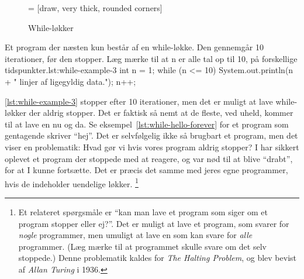         \begin{figure}
        \center
         = [draw, very thick, rounded corners]
        \caption{While-løkker}
        \label{fig:while-loop-illustrated}
        \end{figure}

		\begin{JavaCode}{Et program der næsten kun består af en while-løkke. Den gennemgår 10 iterationer, før den stopper. Læg mærke til at n er alle tal op til 10, på forskellige tidspunkter.}{lst:while-example-3}
			int n = 1;
			while (n <= 10) {
				System.out.println(n + " linjer af ligegyldig data.");
				n++;
			}
		\end{JavaCode}

        \autoref{lst:while-example-3} stopper efter 10
        iterationer, men det er muligt at lave while-løkker der aldrig
        stopper.  Det er faktisk så nemt at de fleste, ved uheld,
        kommer til at lave en nu og da. Se
        eksempel~\ref{lst:while-hello-forever} for et program som
        gentagende skriver ``hej''. Det er selvfølgelig ikke så
        brugbart et program, men det viser en problematik: Hvad gør vi
        hvis vores program aldrig stopper? I har sikkert oplevet et
        program der stoppede med at reagere, og var nød til at blive
        ``drabt'', for at I kunne fortsætte. Det er præcis det samme
        med jeres egne programmer, hvis de indeholder uendelige
        løkker. \footnote{Et relateret spørgsmåle er ``kan man lave et
        program som siger om et program stopper eller ej?''. Det er
        muligt at lave et program, som svarer for \emph{nogle}
        programmer, men umuligt at lave en som kan svare for
        \emph{alle} programmer.  (Læg mærke til at programmet skulle
        svare om det selv stoppede.) Denne problematik kaldes for
        \emph{The Halting Problem}, og blev bevist af \emph{Allan
        Turing} i 1936.}

